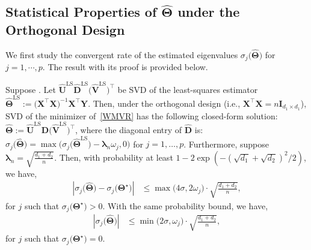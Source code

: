 \documentclass[alpha-refs]{wiley-article}
\begin{document}
\subsection{Statistical Properties of $\widehat{\boldsymbol{\Theta}}$ under the Orthogonal Design}
We first study the convergent rate of the estimated eigenvalues $\sigma_{j}\big(\widehat{\boldsymbol{\Theta}}\big)$ for $j = 1, \cdots, p$.
The result with its proof is provided below.

\begin{proposition} \label{clsed-form}
    Suppose .
    Let $\widehat{\boldsymbol{U}}^{\text{LS}}\widehat{\boldsymbol{D}}^{\text{LS}}\big(\widehat{\boldsymbol{V}}^{\text{LS}}\big)^{\top}$ be SVD of the least-squares estimator $\widehat{\boldsymbol{\Theta}}^{\text{LS}}:=\big(\boldsymbol{X}^{\top}\boldsymbol{X}\big)^{-1}\boldsymbol{X}^{\top}\boldsymbol{Y}$.
    Then, under the orthogonal design (i.e., $\boldsymbol{X}^{\top}\boldsymbol{X}=n\boldsymbol{I}_{d_{1} \times d_{1}}$), SVD of the minimizer of~\eqref{WMVR} has the following closed-form solution:
    $\widehat{\boldsymbol{\Theta}} := \widehat{\boldsymbol{U}}^{\text{LS}}\widehat{\boldsymbol{D}}\big(\widehat{\boldsymbol{V}}^{\text{LS}}\big)^{\top}$,
    where the diagonal entry of $\widehat{\boldsymbol{D}}$ is:
    $\sigma_{j}\big(\widehat{\boldsymbol{\Theta}}\big) = \max \big(  \sigma_{j}\big(\widehat{\boldsymbol{\Theta}}^{\text{LS}}\big)-\boldsymbol{\lambda}_{n} \omega_{j},0 \big)$ for $j=1,\dots,p$.
    Furthermore, suppose $\boldsymbol{\lambda}_{n}=\sqrt{\frac{d_{1}+d_{2}}{n}}$.
    Then, with probability at least $1-2\exp(-(\sqrt{d_{1}}+\sqrt{d_{2}})^{2}/2)$, we have,
    \begin{align} \label{sing1}
        \left| \sigma_{j}\big(\widehat{\boldsymbol{\Theta}}\big)-\sigma_{j}\big(\boldsymbol{\Theta}^{\star}\big)\right|
        &\leq \max\big(4\sigma,2\omega_{j}\big)\cdot \sqrt{\frac{d_{1}+d_{2}}{n}},
    \end{align}
    for $j$ such that $\sigma_{j}\big(\boldsymbol{\Theta}^{\star}\big)>0$.
    With the same probability bound, we have,
    \begin{align} \label{sing2}
        \left| \sigma_{j}\big(\widehat{\boldsymbol{\Theta}}\big)\right|
        &\leq \min\big(2\sigma,\omega_{j}\big)\cdot \sqrt{\frac{d_{1}+d_{2}}{n}},
    \end{align}
    for $j$ such that $\sigma_{j}\big(\boldsymbol{\Theta}^{\star}\big)=0$.
\end{proposition}
\end{document}
